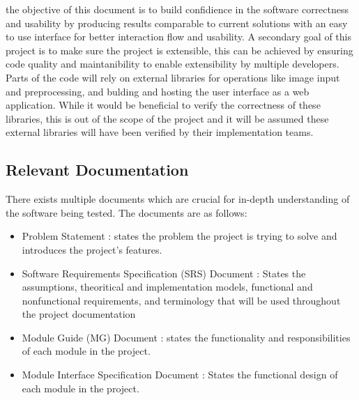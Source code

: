 \documentclass[12pt, titlepage]{article}
\begin{document}
the objective of this document is to build confidience in the software correctness and
usability by producing results comparable to current solutions with an easy to use interface
for better interaction flow and usability. A secondary goal of this project is to make sure the project
is extensible, this can be achieved by ensuring code quality and maintanibility to enable extensibility by multiple developers.
Parts of the code will rely on external libraries for operations like image input and preprocessing, and bulding and hosting the
user interface as a web application. While it would be beneficial to verify the correctness
of these libraries, this is out of the scope of the project and it will be assumed
these external libraries will have been verified by their implementation teams.



\subsection{Relevant Documentation}


There exists multiple documents which are crucial for in-depth understanding of the software being tested.
The documents are as follows:
\begin{itemize}
  \item Problem Statement \cite{BrainInsightProblemStatement2024}: states the problem the project is trying to solve and introduces the project's features.
  \item Software Requirements Specification (SRS) Document \cite{BrainInsightSRS2024}: States the assumptions, theoritical and implementation models,
        functional and nonfunctional requirements, and terminology that will be used throughout the project documentation
  \item Module Guide (MG) Document \cite{BrainInsightMG2024}: states the functionality and responsibilities of each module in the project.
  \item Module Interface Specification Document \cite{BrainInsightMIS2024}: States the functional design of each module in the project.
\end{itemize}
\end{document}
